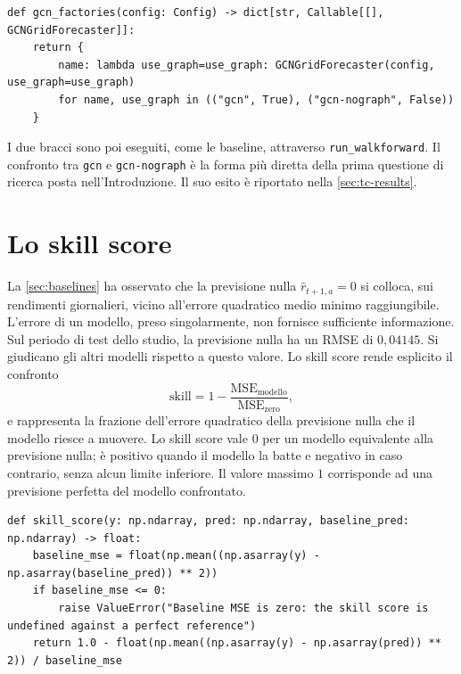 \begin{listing}[H]
\begin{verbatim}
def gcn_factories(config: Config) -> dict[str, Callable[[], GCNGridForecaster]]:
    return {
        name: lambda use_graph=use_graph: GCNGridForecaster(config, use_graph=use_graph)
        for name, use_graph in (("gcn", True), ("gcn-nograph", False))
    }
\end{verbatim}
\caption{\texttt{gcn\_factories}}
\label{lst:gcn-factories}
\end{listing}

I due bracci sono poi eseguiti, come le baseline, attraverso \texttt{run\_walkforward}. Il confronto tra \texttt{gcn} e \texttt{gcn-nograph} è la forma più diretta della prima questione di ricerca posta nell'Introduzione. Il suo esito è riportato nella \cref{sec:tc-results}.

\section{Lo skill score}
\label{sec:tc-skill-score}

La \cref{sec:baselines} ha osservato che la previsione nulla $\hat r_{t+1,a}=0$ si colloca, sui rendimenti giornalieri, vicino all'errore quadratico medio minimo raggiungibile. L'errore di un modello, preso singolarmente, non fornisce sufficiente informazione. Sul periodo di test dello studio, la previsione nulla ha un RMSE di $0{,}04145$. Si giudicano gli altri modelli rispetto a questo valore. Lo skill score rende esplicito il confronto
\begin{equation}
\label{eq:skill-score}
\mathrm{skill} = 1-\frac{\mathrm{MSE}_{\text{modello}}}{\mathrm{MSE}_{\text{zero}}},
\end{equation}
e rappresenta la frazione dell'errore quadratico della previsione nulla che il modello riesce a muovere. Lo skill score vale $0$ per un modello equivalente alla previsione nulla; è positivo quando il modello la batte e negativo in caso contrario, senza alcun limite inferiore. Il valore massimo $1$ corrisponde ad una previsione perfetta del modello confrontato.

\begin{listing}[H]
\begin{verbatim}
def skill_score(y: np.ndarray, pred: np.ndarray, baseline_pred: np.ndarray) -> float:
    baseline_mse = float(np.mean((np.asarray(y) - np.asarray(baseline_pred)) ** 2))
    if baseline_mse <= 0:
        raise ValueError("Baseline MSE is zero: the skill score is undefined against a perfect reference")
    return 1.0 - float(np.mean((np.asarray(y) - np.asarray(pred)) ** 2)) / baseline_mse
\end{verbatim}
\caption{\texttt{skill\_score}}
\label{lst:skill-score}
\end{listing}

